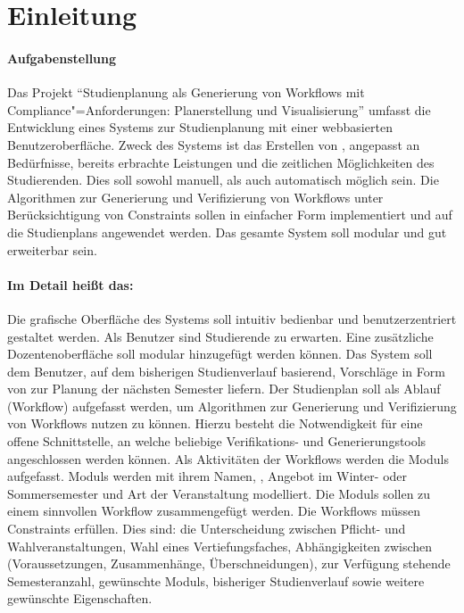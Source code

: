 \section{Einleitung}
\paragraph{Aufgabenstellung}
Das Projekt \enquote{Studienplanung als Generierung von Workflows mit Compliance"=Anforderungen: Planerstellung und Visualisierung} umfasst die Entwicklung eines Systems zur Studienplanung mit einer webbasierten Benutzeroberfläche. Zweck des Systems ist das Erstellen von , angepasst an Bedürfnisse, bereits erbrachte Leistungen und die zeitlichen Möglichkeiten des Studierenden. Dies soll sowohl manuell, als auch automatisch möglich sein. Die Algorithmen zur \gls{Generierung} und \gls{Verifizierung} von Workflows unter Berücksichtigung von \glspl{Constraint} sollen in einfacher Form implementiert und auf die \glspl{Studienplan} angewendet werden. Das gesamte System soll \gls{modular} und gut erweiterbar sein.\\
\paragraph{Im Detail heißt das:}
Die grafische Oberfläche des Systems soll intuitiv bedienbar und benutzerzentriert gestaltet werden. Als \gls{Benutzer} sind Studierende zu erwarten. Eine zusätzliche Dozentenoberfläche soll \gls{modular} hinzugefügt werden können. Das System soll dem \gls{Benutzer}, auf dem bisherigen Studienverlauf basierend, Vorschläge in Form von  zur Planung der nächsten Semester liefern. Der \gls{Studienplan} soll als Ablauf (Workflow) aufgefasst werden, um Algorithmen zur \gls{Generierung} und \gls{Verifizierung} von Workflows nutzen zu können. Hierzu besteht die Notwendigkeit für eine offene Schnittstelle, an welche beliebige Verifikations- und Generierungstools angeschlossen werden können. Als Aktivitäten der Workflows werden die \glspl{Modul} aufgefasst. \glspl{Modul} werden mit ihrem Namen, , Angebot im Winter- oder Sommersemester und Art der Veranstaltung modelliert. Die \glspl{Modul} sollen zu einem sinnvollen Workflow zusammengefügt werden. Die Workflows müssen \glspl{Constraint} erfüllen. Dies sind: die Unterscheidung zwischen Pflicht- und Wahlveranstaltungen, Wahl eines Vertiefungsfaches, Abhängigkeiten zwischen  (Voraussetzungen, Zusammenhänge, Überschneidungen), zur Verfügung stehende Semesteranzahl, gewünschte \glspl{Modul}, bisheriger Studienverlauf sowie weitere gewünschte Eigenschaften.\\